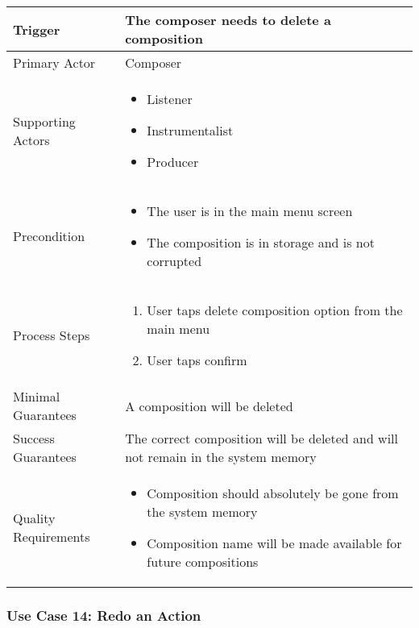 \begin{tabularx}{\textwidth}{|X|X|}
\hline
Trigger & 
The composer needs to delete a composition \\
\hline
Primary Actor & 
Composer \\
\hline
Supporting Actors & 
\begin{itemize}
\item Listener
\item Instrumentalist
\item Producer
\end{itemize} \\
\hline
Precondition & 
\begin{itemize}
\item The user is in the main menu screen
\item The composition is in storage and is not corrupted
\end{itemize} \\
\hline
Process Steps & 
\begin{enumerate}
\item User taps delete composition option from the main menu
\item User taps confirm
\end{enumerate} \\
\hline
Minimal Guarantees & 
A composition will be deleted \\
\hline
Success Guarantees & 
The correct composition will be deleted and will not remain in the system memory \\
\hline
Quality Requirements &
\begin{itemize}
\item Composition should absolutely be gone from the system memory
\item Composition name will be made available for future compositions
\end{itemize} \\ 
\hline
\end{tabularx}

\subsubsection{Use Case 14: Redo an Action}

